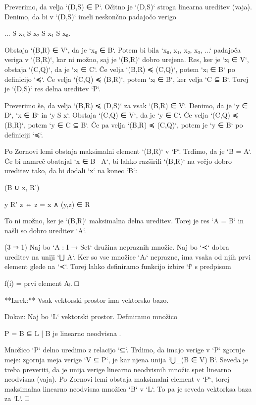 Preverimo, da velja `(D,S) ∈ P`. Očitno je `(D,S)` stroga linearna ureditev
(vaja). Denimo, da bi v `(D,S)` imeli neskončno padajočo verigo

     ... S x₃ S x₂ S x₁ S x₀.

Obstaja `(B,R) ∈ V`, da je `x₀ ∈ B`. Potem bi bila `x₀, x₁, x₂, x₃, ...`
padajoča veriga v `(B,R)`, kar ni možno, saj je `(B,R)` dobro urejena. Res, ker
je `xᵢ ∈ V`, obstaja `(C,Q)`, da je `xᵢ ∈ C`. Če velja `(B,R) ≼ (C,Q)`, potem
`xᵢ ∈ B` po definicijo `≼`. Če velja `(C,Q) ≼ (B,R)`, potem `xᵢ ∈ B`, ker velja
`C ⊆ B`. Torej je `(D,S)` res delna ureditev `P`.

Preverimo še, da velja `(B,R) ≼ (D,S)` za vsak `(B,R) ∈ V`. Denimo, da je `y ∈ D`,
`x ∈ B` in `y S x`. Obstaja `(C,Q) ∈ V`, da je `y ∈ C`. Če velja `(C,Q) ≼ (B,R)`,
potem `y ∈ C ⊆ B`. Če pa velja `(B,R) ≼ (C,Q)`, potem je `y ∈ B` po definiciji `≼`.

Po Zornovi lemi obstaja maksimalni element `(B,R)` v `P`. Trdimo, da je `B = A`. Če bi namreč
obatajal `x ∈ B \ A`, bi lahko razširili `(B,R)` na večjo dobro ureditev tako, da bi dodali `x`
na konec `B`:

    (B ∪ {x}, R')

    y R' z ⇔ z = x ∧ (y,z) ∈ R

To ni možno, ker je `(B,R)` maksimalna delna ureditev. Torej je res `A = B` in
našli so dobro ureditev `A`.

(3 ⇒ 1) Naj bo `A : I → Set` družina nepraznih množic. Naj bo `≺` dobra ureditev
na uniji `⋃ A`. Ker so vse množice `Aᵢ` neprazne, ima vsaka od njih prvi element
glede na `≺`. Torej lahko definiramo funkcijo izbire `f` s predpisom

    f(i) = prvi element Aᵢ. □

**Izrek:** Vsak vektorski prostor ima vektorsko bazo.

Dokaz: Naj bo `L` vektorski prostor. Definiramo množico

    P = { B ⊆ L | B je linearno neodvisna }.

Množico `P` delno uredimo z relacijo `⊆`. Trdimo, da imajo verige v `P` zgornje
meje: zgornja meja verige `V ⊆ P`, je kar njena unija `⋃_(B ∈ V) B`. Seveda je
treba preveriti, da je unija verige linearno neodvisnih množic spet linearno
neodvisna (vaja). Po Zornovi lemi obstaja maksimalni element v `P`, torej
maksimalna linearno neodvisna množica `B` v `L`. To pa je seveda vektorksa baza
za `L`. □

